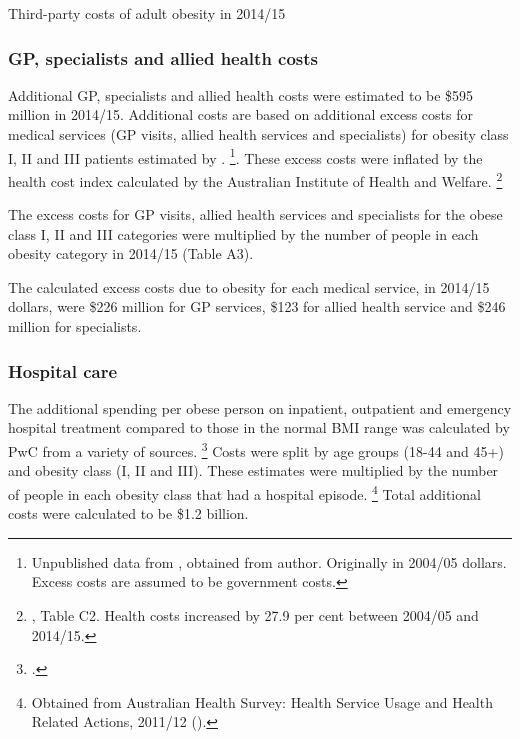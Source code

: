 \documentclass[embargoed]{grattan}
\begin{document}
\begin{table}
\caption{Third-party costs of adult obesity in 2014/15}



\end{table}

\subsubsection{GP, specialists and allied health costs}\label{gp-specialists-and-allied-health-costs}

Additional GP, specialists and allied health costs were estimated to be \$595 million in 2014/15.
Additional costs are based on additional excess costs for medical services (GP visits, allied health services and specialists) for obesity class I, II and III patients estimated by \textcite{Colagiuri2010costoverweightobesity}.%
\footnote{Unpublished data from \textcite{Colagiuri2010costoverweightobesity}, obtained from author.
Originally in 2004/05 dollars.
Excess costs are assumed to be government costs.}.
These excess costs were inflated by the health cost index calculated by the Australian Institute of Health and Welfare.%
\footnote{\textcite{Health2015HealthexpenditureAustralia}, Table C2.
Health costs increased by 27.9 per cent between 2004/05 and 2014/15.}

The excess costs for GP visits, allied health services and specialists for the obese class I, II and III categories were multiplied by the number of people in each obesity category in 2014/15 (Table A3).

The calculated excess costs due to obesity for each medical service, in 2014/15 dollars, were \$226 million for GP services, \$123 for allied health service and \$246 million for specialists.

\subsubsection{Hospital care }\label{hospital-care}

The additional spending per obese person on inpatient, outpatient and emergency hospital treatment compared to those in the normal BMI range was calculated by PwC from a variety of sources.%
\footcite[][48]{PwC2015Weighingcostobesity} Costs were split by age groups (18-44 and 45+) and obesity class (I, II and III).
These estimates were multiplied by the number of people in each obesity class that had a hospital episode.%
\footnote{Obtained from Australian Health Survey: Health Service Usage and Health Related Actions, 2011/12 (\textcite{ABS20134364055002AustralianHealth}).} Total additional costs were calculated to be \$1.2 billion.
\end{document}

